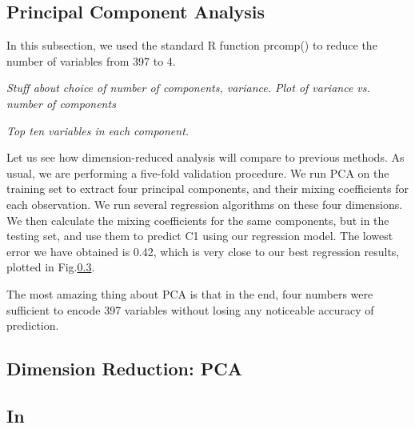 \subsection{Principal Component Analysis}
In this subsection, we used the standard R function prcomp() to reduce the number of variables from 397 to 4.

{\it Stuff about choice of number of components, variance. Plot of variance vs. number of components}


{\it Top ten variables in each component.}

Let us see how dimension-reduced analysis will compare to previous methods. As usual, we are performing a five-fold validation procedure. We run PCA on the training set to extract four principal components, and their mixing coefficients for each observation. We run several regression algorithms on these four dimensions. We then calculate the mixing coefficients for the same components, but in the testing set, and use them to predict C1 using our regression model. 
The lowest error we have obtained is 0.42, which is very close to our best regression results, plotted in Fig.\ref{}.

The most amazing thing about PCA is that in the end, four numbers were sufficient to encode 397 variables without losing any noticeable accuracy of prediction.

\subsection{Dimension Reduction: PCA}

\subsection{In}